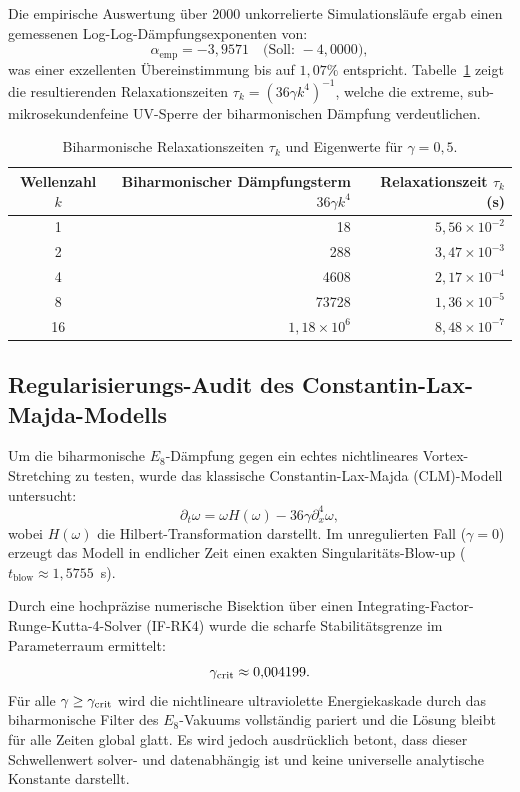 \documentclass[11pt,twoside,a4paper]{article}
\begin{document}
	Die empirische Auswertung über $2000$ unkorrelierte Simulationsläufe ergab einen gemessenen Log-Log-Dämpfungsexponenten von:
	\begin{equation}
		\alpha_{\text{emp}} = -3{,}9571 \quad \text{(Soll: } -4{,}0000\text{)},
	\end{equation}
	was einer exzellenten Übereinstimmung bis auf $1{,}07\%$ entspricht. Tabelle~\ref{tab:relaxation_times} zeigt die resultierenden Relaxationszeiten $\tau_k = (36\gamma k^4)^{-1}$, welche die extreme, sub-mikrosekundenfeine UV-Sperre der biharmonischen Dämpfung verdeutlichen.
	
	\begin{table}[htbp]
		\centering
		\caption{Biharmonische Relaxationszeiten $\tau_k$ und Eigenwerte für $\gamma = 0{,}5$.}
		\label{tab:relaxation_times}
		\begin{tabular}{crr}
			\toprule
			Wellenzahl $k$ & Biharmonischer Dämpfungsterm $36\gamma k^4$ & Relaxationszeit $\tau_k$ (s) \\
			\midrule
			1   & 18                  & $5{,}56 \times 10^{-2}$ \\
			2   & 288                 & $3{,}47 \times 10^{-3}$ \\
			4   & 4608                & $2{,}17 \times 10^{-4}$ \\
			8   & 73728               & $1{,}36 \times 10^{-5}$ \\
			16  & $1{,}18 \times 10^6$  & $8{,}48 \times 10^{-7}$ \\
			\bottomrule
		\end{tabular}
	\end{table}
	
	\subsection{Regularisierungs-Audit des Constantin-Lax-Majda-Modells}
	Um die biharmonische $E_8$-Dämpfung gegen ein echtes nichtlineares Vortex-Stretching zu testen, wurde das klassische Constantin-Lax-Majda (CLM)-Modell untersucht:
	\begin{equation}
		\partial_t \omega = \omega H(\omega) - 36\gamma \partial_x^4 \omega,
	\end{equation}
	wobei $H(\omega)$ die Hilbert-Transformation darstellt. Im unregulierten Fall ($\gamma = 0$) erzeugt das Modell in endlicher Zeit einen exakten Singularitäts-Blow-up ($t_{\text{blow}} \approx 1{,}5755$\ s).
	
	Durch eine hochpräzise numerische Bisektion über einen Integrating-Factor-Runge-Kutta-4-Solver (IF-RK4) wurde die scharfe Stabilitätsgrenze im Parameterraum ermittelt:
	\begin{equation}
		\gamma_{\rm crit} \approx 0{,}004199.
	\end{equation}
	Für alle $\gamma \ge \gamma_{\rm crit}$ wird die nichtlineare ultraviolette Energiekaskade durch das biharmonische Filter des $E_8$-Vakuums vollständig pariert und die Lösung bleibt für alle Zeiten global glatt. Es wird jedoch ausdrücklich betont, dass dieser Schwellenwert solver- und datenabhängig ist und keine universelle analytische Konstante darstellt.
	
\end{document}
